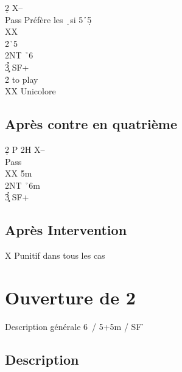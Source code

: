 \documentclass[a4paper]{article}
\begin{document}
\begin{bidtable}
2\d \> X--\+\\
Pass \> Préfère les \d\ si 5\h\ 5\d \+\\
XX \h \\
2\h {}\h\ 5\c \\
2NT \h\ 6\c \\
3\c\d\h\s \> SF+\-\\
2\h \> to play\\
XX \> Unicolore\-
\end{bidtable}

\subsection{Après contre en quatrième}

\begin{bidtable}
2\d \> P 2H X--\+\\
Pass \h \\
XX \h 5m\\
2NT \h\ 6m\\
3\c\d\h\s \> SF+\-
\end{bidtable}

\subsection{Après Intervention}

X Punitif dans tous les cas

\newpage

\section{Ouverture de 2\pdfh}

Description générale 6\s\ / 5\s +5m / SF \h 

\subsection{Description}
\end{document}
